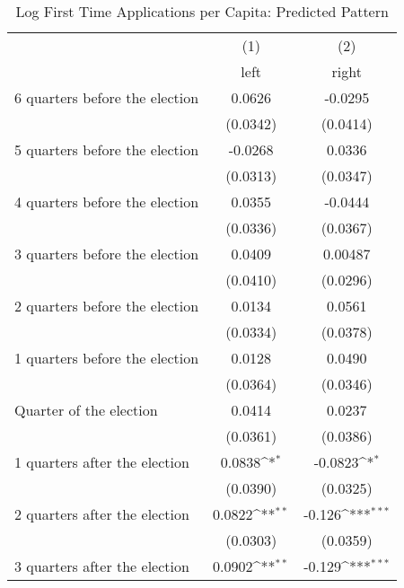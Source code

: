 \begin{table}[htbp]\centering
\def\sym#1{\ifmmode^{#1}\else\(^{#1}\)\fi}
\caption{Log First Time Applications per Capita: Predicted Pattern}
\begin{tabular}{l*{2}{c}}
\hline\hline
                    &\multicolumn{1}{c}{(1)}&\multicolumn{1}{c}{(2)}\\
                    &\multicolumn{1}{c}{left}&\multicolumn{1}{c}{right}\\
\hline
 6 quarters before the election&      0.0626         &     -0.0295         \\
                    &    (0.0342)         &    (0.0414)         \\
[1em]
 5 quarters before the election&     -0.0268         &      0.0336         \\
                    &    (0.0313)         &    (0.0347)         \\
[1em]
 4 quarters before the election&      0.0355         &     -0.0444         \\
                    &    (0.0336)         &    (0.0367)         \\
[1em]
 3 quarters before the election&      0.0409         &     0.00487         \\
                    &    (0.0410)         &    (0.0296)         \\
[1em]
 2 quarters before the election&      0.0134         &      0.0561         \\
                    &    (0.0334)         &    (0.0378)         \\
[1em]
 1 quarters before the election&      0.0128         &      0.0490         \\
                    &    (0.0364)         &    (0.0346)         \\
[1em]
Quarter of the election&      0.0414         &      0.0237         \\
                    &    (0.0361)         &    (0.0386)         \\
[1em]
 1 quarters after the election&      0.0838\sym{*}  &     -0.0823\sym{*}  \\
                    &    (0.0390)         &    (0.0325)         \\
[1em]
 2 quarters after the election&      0.0822\sym{**} &      -0.126\sym{***}\\
                    &    (0.0303)         &    (0.0359)         \\
[1em]
 3 quarters after the election&      0.0902\sym{**} &      -0.129\sym{***}\\

\end{tabular}
\end{table}
